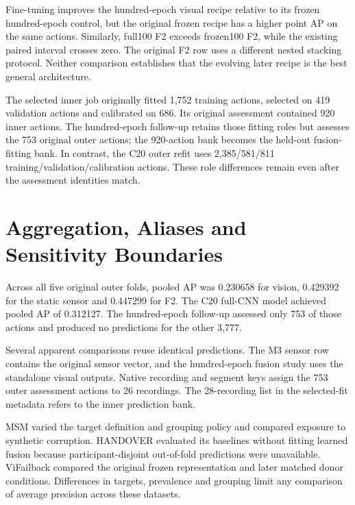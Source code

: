 Fine-tuning improves the hundred-epoch visual recipe relative to its frozen hundred-epoch control, but the original frozen recipe has a higher point AP on the same actions. Similarly, full100 F2 exceeds frozen100 F2, while the existing paired interval crosses zero. The original F2 row uses a different nested stacking protocol. Neither comparison establishes that the evolving later recipe is the best general architecture.

The selected inner job originally fitted 1,752 training actions, selected on 419 validation actions and calibrated on 686. Its original assessment contained 920 inner actions. The hundred-epoch follow-up retains those fitting roles but assesses the 753 original outer actions; the 920-action bank becomes the held-out fusion-fitting bank. In contrast, the C20 outer refit uses 2,385/581/811 training/validation/calibration actions. These role differences remain even after the assessment identities match.

\section{Aggregation, Aliases and Sensitivity Boundaries}
Across all five original outer folds, pooled AP was 0.230658 for vision, 0.429392 for the static sensor and 0.447299 for F2. The C20 full-CNN model achieved pooled AP of 0.312127. The hundred-epoch follow-up assessed only 753 of those actions and produced no predictions for the other 3,777.

Several apparent comparisons reuse identical predictions. The M3 sensor row contains the original sensor vector, and the hundred-epoch fusion study uses the standalone visual outputs. Native recording and segment keys assign the 753 outer assessment actions to 26 recordings. The 28-recording list in the selected-fit metadata refers to the inner prediction bank.

MSM varied the target definition and grouping policy and compared exposure to synthetic corruption. HANDOVER evaluated its baselines without fitting learned fusion because participant-disjoint out-of-fold predictions were unavailable. ViFailback compared the original frozen representation and later matched donor conditions. Differences in targets, prevalence and grouping limit any comparison of average precision across these datasets.
